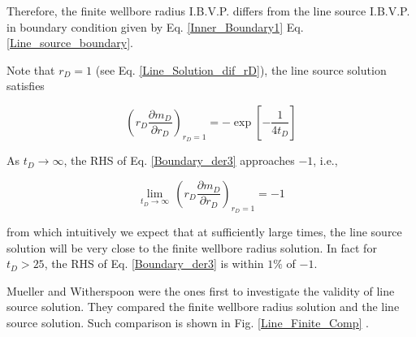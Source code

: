 \documentclass{llncs}
\numberwithin{equation}{section}
\numberwithin{figure}{section}
\numberwithin{table}{section}
\begin{document}
    Therefore, the finite wellbore radius I.B.V.P. differs from the line source I.B.V.P. in  boundary condition  given by Eq. \ref{Inner_Boundary1} Eq. \ref{Line_source_boundary}.

    Note that $r_{D}=1$ (see Eq. \ref{Line_Solution_dif_rD}), the line source solution satisfies

    \begin{equation}
        {{\left( {{r}_{D}}\frac{\partial {{ m }_{D}}}{\partial {{r}_{D}}} \right)}_{{{r}_{D}}=1}}=-\exp \left[ -\frac{1}{4{{t}_{D}}} \right]
        \label{Boundary_der3}
    \end{equation}

    As $t_{D}\rightarrow\infty$, the RHS of Eq. \ref{Boundary_der3} approaches $-1$, i.e.,

    \begin{equation}
    \underset{{{t}_{D}}\to \infty }{\mathop{\lim }}\,{{\left( {{r}_{D}}\frac{\partial {{ m }_{D}}}{\partial {{r}_{D}}} \right)}_{{{r}_{D}}=1}}=-1
        \label{Boundary_der4}
    \end{equation}

    from which intuitively we expect that at sufficiently large times, the line source solution  will be very close to the finite wellbore radius solution. In fact for $t_{D}>25$, the RHS of Eq. \ref{Boundary_der3} is within $1\%$ of $-1$.

    Mueller and Witherspoon \cite{Mueller_1965_1} were the ones first to investigate the validity of line source solution. They compared the finite wellbore radius solution and the line source solution. Such comparison is shown in Fig. \ref{Line_Finite_Comp} .
\end{document}
